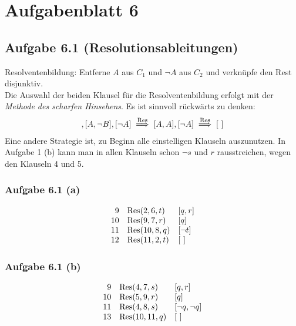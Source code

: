 
\section{Aufgabenblatt 6}
\subsection{Aufgabe 6.1 (Resolutionsableitungen)}
Resolventenbildung: Entferne $A$ aus $C_1$ und $\neg A$ aus $C_2$ und verknüpfe den Rest disjunktiv.\\
Die Auswahl der beiden Klausel für die Resolventenbildung erfolgt mit der \textit{Methode des scharfen Hinsehens}. 
Es ist sinnvoll rückwärts zu denken:
\begin{align*}
	[A,B],[A,\neg B],[\neg A]\Reso[A,A],[\neg A]\Reso[~]
\end{align*}
Eine andere Strategie ist, zu Beginn alle einstelligen Klauseln auszunutzen. 
In Aufgabe 1 (b) kann man in allen Klauseln schon $\neg s$ und $r$ rausstreichen, wegen den Klauseln 4 und 5.

\subsubsection{Aufgabe 6.1 (a)}
\begin{align*}
	\begin{array}{rll}
		9 & \operatorname{Res}(2,6,t) & [q,r]\\
		10 & \operatorname{Res}(9, 7,r) & [q]\\
		11 & \operatorname{Res}(10,8,q) & [\neg t]\\
		12 & \operatorname{Res}(11,2, t) & [~]
	\end{array}
\end{align*}

\subsubsection{Aufgabe 6.1 (b)}
\begin{align*}
	\begin{array}{rll}
		9 & \operatorname{Res}(4,7,s) & [q,r]\\
		10 & \operatorname{Res}(5,9,r) & [q]\\
		11 & \operatorname{Res}(4,8,s) & [\neg q,\neg q]\\
		13 & \operatorname{Res}(10,11,q) & [~]
	\end{array}
\end{align*}

